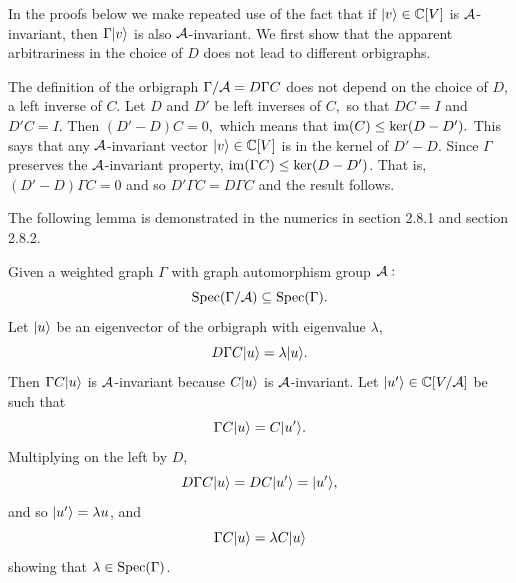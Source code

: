 
In the proofs below we make repeated use of the fact that if
$|{v}\rangle\in\mathbb{C}[V]$ is $\mathcal{A}$-invariant, then $\Gamma|{v}\rangle$
is also $\mathcal{A}$-invariant.
We first show that the apparent arbitrariness in the choice of $D$ does
not lead to different orbigraphs.

The definition of the orbigraph $\Gamma/\mathcal{A} = D\Gamma C$ does not depend on the
choice of $D$, a left inverse of $C$.
\doproof
Let $D$ and $D'$ be left inverses of $C,$ so that $DC=I$ and $D'C=I.$
Then 
$ (D'-D)C = 0,$ which means that $\mathrm{im}(C)\le \mathrm{ker}(D-D').$
This says that any $\mathcal{A}$-invariant vector $|{v}\rangle\in\mathbb{C}[V]$
is in the kernel of $D'-D.$
Since $\Gamma$ preserves the $\mathcal{A}$-invariant property,
$\mathrm{im}(\Gamma C)\le \mathrm{ker}(D-D')$. That is, $(D'-D)\Gamma C=0$ and so
$D'\Gamma C=D\Gamma C$ and the result follows.
\tombstone

The following lemma is demonstrated in the numerics in section 2.8.1 and
section 2.8.2.

Given a weighted graph $\Gamma$ with graph automorphism group $\mathcal{A}:$
$$
    \mbox{Spec}(\Gamma/\mathcal{A}) \subseteq \mbox{Spec}(\Gamma).
$$
\doproof
Let $|{u}\rangle$ be an eigenvector of the orbigraph with eigenvalue $\lambda$,
$$
    D\Gamma C|{u}\rangle = \lambda|{u}\rangle.
$$
Then $\Gamma C|{u}\rangle$ is $\mathcal{A}$-invariant because $C|{u}\rangle$ is $\mathcal{A}$-invariant.
Let $|{u'}\rangle\in\mathbb{C}[V/\mathcal{A}]$ be such that
$$
    \Gamma C|{u}\rangle = C|{u'}\rangle.
$$
Multiplying on the left by $D$,
$$
    D \Gamma C|{u}\rangle = DC|{u'}\rangle = |{u'}\rangle,
$$
and so $|{u'}\rangle=\lambda{u}$, and
$$
    \Gamma C|{u}\rangle = \lambda C|{u}\rangle
$$
showing that $\lambda\in\mbox{Spec}(\Gamma)$.
\tombstone

